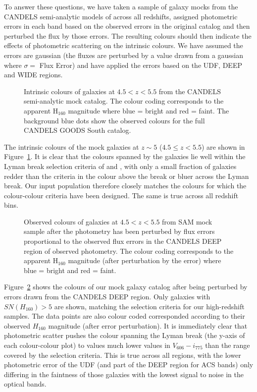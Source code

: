 To answer these questions, we have taken a sample of galaxy mocks from the CANDELS semi-analytic models of \citet{Somerville:2008ed} across all redshifts, assigned photometric errors in each band based on the observed errors in the original catalog and then perturbed the flux by those errors. The resulting colours should then indicate the effects of photometric scattering on the intrinsic colours. We have assumed the errors are gaussian (the fluxes are perturbed by a value drawn from a gaussian where $\sigma =$ Flux Error) and have applied the errors based on the UDF, DEEP and WIDE regions. 

\begin{figure}
\centering
\caption{Intrinsic colours of galaxies at $4.5 < z < 5.5$ from the CANDELS semi-analytic mock catalog. The colour coding corresponds to the apparent H$_{160}$ magnitude where blue = bright and red = faint. The background blue dots show the observed colours for the full CANDELS GOODS South catalog.}
\label{fig:mock_col}
\end{figure}

The intrinsic colours of the mock galaxies at $z \sim 5$ ($4.5 \leq z < 5.5$) are shown in Figure~\ref{fig:mock_col}. It is clear that the colours spanned by the galaxies lie well within the Lyman break selection criteria of \citet{2007ApJ...670..928B} and \citet{Gonzalez:2011dn}, with only a small fraction of galaxies redder than the criteria in the colour above the break or bluer across the Lyman break. Our input population therefore closely matches the colours for which the colour-colour criteria have been designed. The same is true across all redshift bins.

\begin{figure}
\centering
\caption{Observed colours of galaxies at $4.5 < z < 5.5$ from SAM mock sample after the photometry has been perturbed by flux errors proportional to the observed flux errors in the CANDELS DEEP region of observed photometry. The colour coding corresponds to the apparent H$_{160}$ magnitude (after perturbation by the error) where blue = bright and red = faint.}
\label{fig:mock_col_err}
\end{figure}

Figure~\ref{fig:mock_col_err} shows the colours of our mock galaxy catalog after being perturbed by errors drawn from the CANDELS DEEP region. Only galaxies with $SN(H_{160}) > 5$ are shown, matching the selection criteria for our high-redshift samples. The data points are also colour coded corresponded according to their observed $H_{160}$ magnitude (after error perturbation). It is immediately clear that photometric scatter pushes the colour spanning the Lyman break (the y-axis of each colour-colour plot) to values much lower values in $V_{606} - i_{775}$ than the range covered by the selection criteria. This is true across all regions, with the lower photometric error of the UDF (and part of the DEEP region for ACS bands) only differing in the faintness of those galaxies with the lowest signal to noise in the optical bands.

